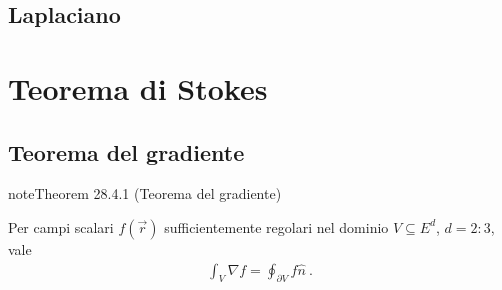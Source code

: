 \documentclass[letterpaper,10pt,italian]{jupyterBook}
\begin{document}
\subsection{Laplaciano}
\label{\detokenize{ch/vector-calculus/derivatives:laplaciano}}\label{\detokenize{ch/vector-calculus/derivatives:vector-calculus-derivatives-laplacian}}
\sphinxstepscope


\section{Teorema di Stokes}
\label{\detokenize{ch/vector-calculus/stokes:teorema-di-stokes}}\label{\detokenize{ch/vector-calculus/stokes:vector-calculus-stokes}}\label{\detokenize{ch/vector-calculus/stokes::doc}}

\subsection{Teorema del gradiente}
\label{\detokenize{ch/vector-calculus/stokes:teorema-del-gradiente}}\label{\detokenize{ch/vector-calculus/stokes:vector-calculus-stokes-gradient}}\label{ch/vector-calculus/stokes:theorem-0}
\begin{sphinxadmonition}{note}{Theorem 28.4.1 (Teorema del gradiente)}



\sphinxAtStartPar
Per campi scalari \(f(\vec{r})\) sufficientemente regolari nel dominio \(V \subseteq E^d\), \(d=2:3\), vale
\begin{equation}\label{equation:ch/vector-calculus/stokes:eq:thm-gradient}
\begin{split}\int_{V} \nabla f = \oint_{\partial V} f \hat{n} \ .\end{split}
\end{equation}\end{sphinxadmonition}
\label{ch/vector-calculus/stokes:thm-gradient-1}
\end{document}
